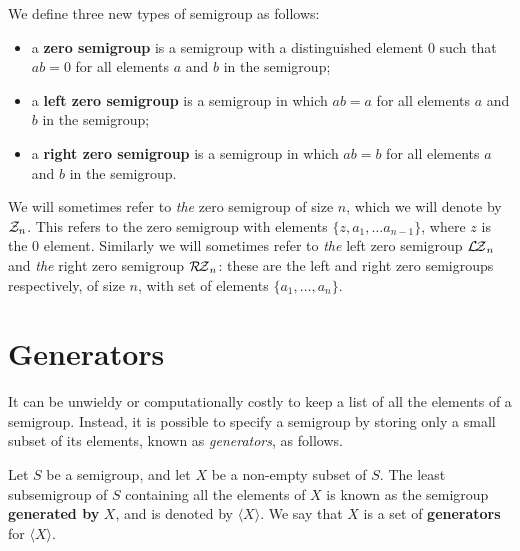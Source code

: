 \begin{definition}
  \label{def:zn}
  We define three new types of semigroup as follows:
  \begin{itemize}
  \item a \textbf{zero semigroup} is a semigroup with a distinguished element
    $0$ such that $ab=0$ for all elements $a$ and $b$ in the semigroup;
  \item a \textbf{left zero semigroup} is a semigroup in which $ab=a$ for all
    elements $a$ and $b$ in the semigroup;
  \item a \textbf{right zero semigroup} is a semigroup in which $ab=b$ for all
    elements $a$ and $b$ in the semigroup.
  \end{itemize}
\end{definition}
We will sometimes refer to \textit{the} zero semigroup of size $n$, which we
will denote by $\mathcal{Z}_n$.  This refers to the zero semigroup with elements
$\{z, a_1, \ldots a_{n-1}\}$, where $z$ is the $0$ element.  Similarly we will
sometimes refer to \textit{the} left zero semigroup $\mathcal{L\!Z}_n$ and \textit{the}
right zero semigroup $\mathcal{R\!Z}_n$: these are the left and right zero semigroups
respectively, of size $n$, with set of elements $\{a_1, \ldots, a_n\}$.

\section{Generators}
\label{sec:intro-generators}

It can be unwieldy or computationally costly to keep a list of all the elements
of a semigroup.  Instead, it is possible to specify a semigroup by storing only
a small subset of its elements, known as \textit{generators}, as follows.

\begin{definition}
  \label{def:generator}
  Let $S$ be a semigroup, and let $X$ be a non-empty subset of $S$.  The least
  subsemigroup of $S$ containing all the elements of $X$ is known as the
  semigroup \textbf{generated by} $X$, and is denoted by $\langle X \rangle$.
  We say that $X$ is a set of \textbf{generators} for $\langle X \rangle$.
\end{definition}

